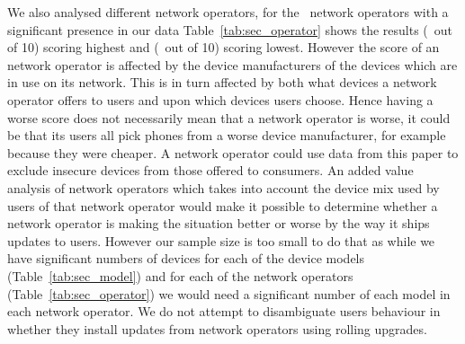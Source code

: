 \daTabSecScoresoperator
We also analysed different network operators, for the \daNumSigOperators\ network operators with a significant presence in our data Table~\ref{tab:sec_operator} shows the results \emph{\daSecScoreBestoperator} (\daSecScoreBestoperatorScore\ out of 10) scoring highest and \emph{\daSecScoreWorstoperator} (\daSecScoreWorstoperatorScore\ out of 10) scoring lowest.
However the score of an network operator is affected by the device manufacturers of the devices which are in use on its network.
This is in turn affected by both what devices a network operator offers to users and upon which devices users choose.
Hence having a worse score does not necessarily mean that a network operator is worse, it could be that its users all pick phones from a worse device manufacturer, for example because they were cheaper.
A network operator could use data from this paper to exclude insecure devices from those offered to consumers.
An added value analysis of network operators which takes into account the device mix used by users of that network operator would make it possible to determine whether a network operator is making the situation better or worse by the way it ships updates to users.
However our sample size is too small to do that as while we have significant numbers of devices for each of the device models (Table~\ref{tab:sec_model}) and for each of the network operators (Table~\ref{tab:sec_operator}) we would need a significant number of each model in each network operator.
We do not attempt to disambiguate users behaviour in whether they install updates from network operators using rolling upgrades.


